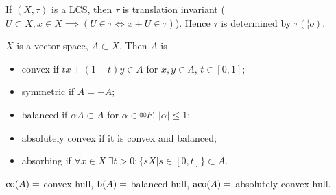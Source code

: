 \documentclass[12pt]{article}					%
\begin{document}
\begin{tvrzeni}[Observation]
	If $(X, τ)$ is a LCS, then $τ$ is translation invariant ($U \subset X, x \in X \implies (U \in τ \Leftrightarrow x + U \in τ)$). Hence $τ$ is determined by $τ(¦o)$.
\end{tvrzeni}

\begin{definice}
	$X$ is a vector space, $A \subset X$. Then $A$ is
	\begin{itemize}
		\item convex if $tx + (1 - t)y \in A$ for $x, y \in A$, $t \in [0, 1]$;
		\item symmetric if $A = -A$;
		\item balanced if $α A \subset A$ for $α \in ®F$, $|α| ≤ 1$;
		\item absolutely convex if it is convex and balanced;
		\item absorbing if $\forall x \in X\ \exists t > 0: \{s X | s \in [0, t]\} \subset A$.
	\end{itemize}
\end{definice}

\begin{definice}
	$\operatorname{co}(A) = $ convex hull, $\operatorname{b}(A) = $ balanced hull, $\operatorname{aco}(A) = $ absolutely convex hull.
\end{definice}
\end{document}
